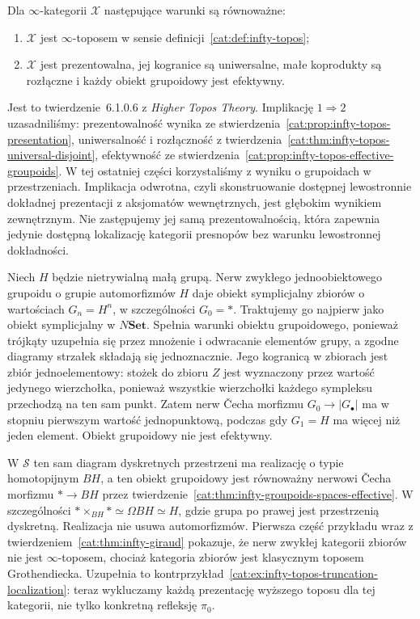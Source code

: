 \begin{twierdzenie}\label{cat:thm:infty-giraud}
Dla $\infty$-kategorii $\mathcal X$ następujące warunki są równoważne:
\begin{enumerate}
 \item $\mathcal X$ jest $\infty$-toposem w sensie definicji~\ref{cat:def:infty-topos};
 \item $\mathcal X$ jest prezentowalna, jej kogranice są uniwersalne, małe koprodukty są rozłączne i każdy obiekt grupoidowy jest efektywny.
\end{enumerate}
\end{twierdzenie}

Jest to twierdzenie~6.1.0.6 z \emph{Higher Topos Theory}. Implikację $1\Rightarrow2$ uzasadniliśmy: prezentowalność wynika ze stwierdzenia~\ref{cat:prop:infty-topos-presentation}, uniwersalność i rozłączność z twierdzenia~\ref{cat:thm:infty-topos-universal-disjoint}, efektywność ze stwierdzenia~\ref{cat:prop:infty-topos-effective-groupoids}. W tej ostatniej części korzystaliśmy z wyniku o grupoidach w przestrzeniach. Implikacja odwrotna, czyli skonstruowanie dostępnej lewostronnie dokładnej prezentacji z aksjomatów wewnętrznych, jest głębokim wynikiem zewnętrznym. Nie zastępujemy jej samą prezentowalnością, która zapewnia jedynie dostępną lokalizację kategorii presnopów bez warunku lewostronnej dokładności.

\begin{przyklad}\label{cat:ex:infty-giraud-sets}
Niech $H$ będzie nietrywialną małą grupą. Nerw zwykłego jednoobiektowego grupoidu o grupie automorfizmów $H$ daje obiekt symplicjalny zbiorów o wartościach $G_n=H^n$, w szczególności $G_0=*$. Traktujemy go najpierw jako obiekt symplicjalny w $N\mathbf{Set}$. Spełnia warunki obiektu grupoidowego, ponieważ trójkąty uzupełnia się przez mnożenie i odwracanie elementów grupy, a zgodne diagramy strzałek składają się jednoznacznie. Jego kogranicą w zbiorach jest zbiór jednoelementowy: stożek do zbioru $Z$ jest wyznaczony przez wartość jedynego wierzchołka, ponieważ wszystkie wierzchołki każdego sympleksu przechodzą na ten sam punkt. Zatem nerw Čecha morfizmu $G_0\to |G_\bullet|$ ma w stopniu pierwszym wartość jednopunktową, podczas gdy $G_1=H$ ma więcej niż jeden element. Obiekt grupoidowy nie jest efektywny.

W $\mathcal S$ ten sam diagram dyskretnych przestrzeni ma realizację o typie homotopijnym $BH$, a ten obiekt grupoidowy jest równoważny nerwowi Čecha morfizmu $*\to BH$ przez twierdzenie~\ref{cat:thm:infty-groupoids-spaces-effective}. W szczególności $*\times_{BH}*\simeq\Omega BH\simeq H$, gdzie grupa po prawej jest przestrzenią dyskretną. Realizacja nie usuwa automorfizmów. Pierwsza część przykładu wraz z twierdzeniem~\ref{cat:thm:infty-giraud} pokazuje, że nerw zwykłej kategorii zbiorów nie jest $\infty$-toposem, chociaż kategoria zbiorów jest klasycznym toposem Grothendiecka. Uzupełnia to kontrprzykład~\ref{cat:ex:infty-topos-truncation-localization}: teraz wykluczamy każdą prezentację wyższego toposu dla tej kategorii, nie tylko konkretną refleksję $\pi_0$.
\end{przyklad}

